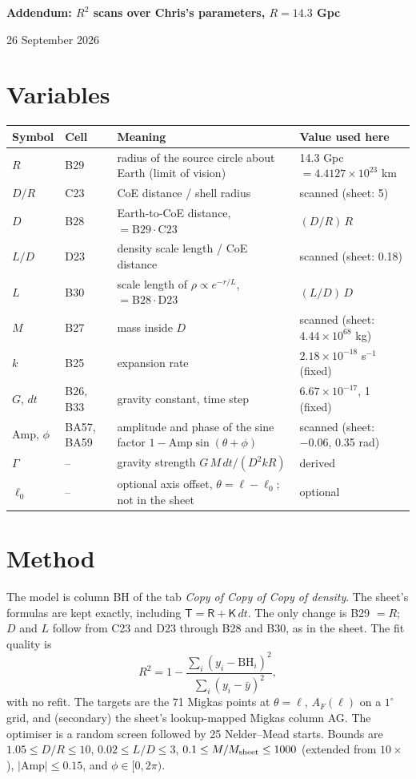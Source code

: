 \documentclass[10pt]{article}
\begin{document}
{\centering\large\textbf{Addendum: $R^2$ scans over Chris's parameters, $R=14.3$ Gpc}\par\normalsize 26 September 2026\par}

\section{Variables}
\begin{table}[H]\centering\small\setlength{\tabcolsep}{4pt}
\begin{tabular}{@{}llll@{}}\toprule
Symbol & Cell & Meaning & Value used here\\\midrule
$R$ & B29 & radius of the source circle about Earth (limit of vision) & 14.3 Gpc $=4.4127\times10^{23}$ km\\
$D/R$ & C23 & CoE distance / shell radius & scanned (sheet: 5)\\
$D$ & B28 & Earth-to-CoE distance, $=\mathrm{B29}\cdot\mathrm{C23}$ & $(D/R)\,R$\\
$L/D$ & D23 & density scale length / CoE distance & scanned (sheet: 0.18)\\
$L$ & B30 & scale length of $\rho\propto e^{-r/L}$, $=\mathrm{B28}\cdot\mathrm{D23}$ & $(L/D)\,D$\\
$M$ & B27 & mass inside $D$ & scanned (sheet: $4.44\times10^{68}$ kg)\\
$k$ & B25 & expansion rate & $2.18\times10^{-18}$ s$^{-1}$ (fixed)\\
$G$, $dt$ & B26, B33 & gravity constant, time step & $6.67\times10^{-17}$, 1 (fixed)\\
Amp, $\phi$ & BA57, BA59 & amplitude and phase of the sine factor $1-\mathrm{Amp}\sin(\theta+\phi)$ & scanned (sheet: $-0.06$, 0.35 rad)\\
$\Gamma$ & -- & gravity strength $G\,M\,dt/(D^2kR)$ & derived\\
$\ell_0$ & -- & optional axis offset, $\theta=\ell-\ell_0$; not in the sheet & optional\\\bottomrule
\end{tabular}\end{table}

\section{Method}
The model is column BH of the tab \emph{Copy of Copy of Copy of density}. The sheet's formulas are kept exactly, including $\mathsf T=\mathsf R+\mathsf K\,dt$. The only change is B29 $=R$; $D$ and $L$ follow from C23 and D23 through B28 and B30, as in the sheet. The fit quality is
\begin{equation}
R^2=1-\frac{\sum_i(y_i-\mathrm{BH}_i)^2}{\sum_i(y_i-\bar y)^2},
\end{equation}
with no refit. The targets are the 71 Migkas points at $\theta=\ell$, $A_F(\ell)$ on a $1^\circ$ grid, and (secondary) the sheet's lookup-mapped Migkas column AG. The optimiser is a random screen followed by 25 Nelder--Mead starts. Bounds are $1.05\le D/R\le10$, $0.02\le L/D\le3$, $0.1\le M/M_{\rm sheet}\le1000$ (extended from $10\times$), $|\mathrm{Amp}|\le0.15$, and $\phi\in[0,2\pi)$.
\end{document}

